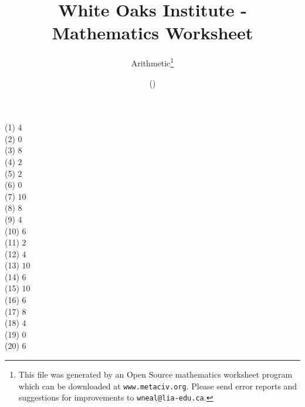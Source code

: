 \documentclass[letter]{article}
\begin{document}
\title{White Oaks Institute - Mathematics Worksheet}
\author{Arithmetic\thanks{This file was generated by an \textsf{Open Source} mathematics worksheet program which can be downloaded at \texttt{www.metaciv.org}. Please send error reports and suggestions for improvements to \texttt{wneal@lia-edu.ca}.}}
\date{\XCfileversion{} (\XCfiledate)}
\maketitle
\begin{multicols}{2}(1) $4$\\(2) $0$\\(3) $8$\\(4) $2$\\(5) $2$\\(6) $0$\\(7) $10$\\(8) $8$\\(9) $4$\\(10) $6$\\(11) $2$\\(12) $4$\\(13) $10$\\(14) $6$\\(15) $10$\\(16) $6$\\(17) $8$\\(18) $4$\\(19) $0$\\(20) $6$\end{multicols}
\end{document}
